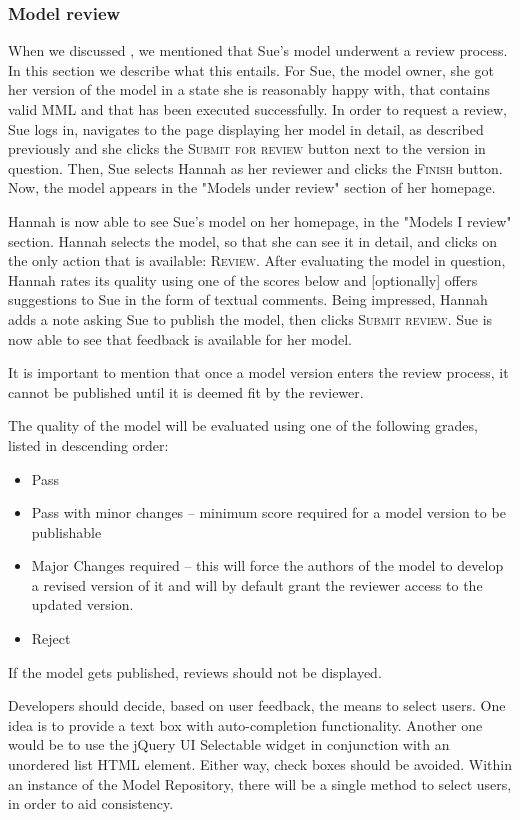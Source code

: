 \subsubsection{Model review}
When we discussed , we mentioned that Sue's model underwent a review process. In this section we describe what this entails.
For Sue, the model owner, she got her version of the model in a state she is reasonably happy with, that contains valid MML and that has been executed successfully. In order to request a review, Sue logs in, navigates to the page displaying her model in detail, as described previously and  she clicks the \textsc{Submit for review} button next to the version in question. Then, Sue selects Hannah as her reviewer and clicks the  \textsc{Finish} button. Now, the model appears in the "Models under review" section of her homepage.

Hannah is now able to see Sue's model on her homepage, in the "Models I review" section. Hannah selects the model, so that she can see it in detail, and clicks on the only action that is available: \textsc{Review}. After evaluating the model in question, Hannah rates its quality using one of the scores below and [optionally] offers suggestions to Sue in the form of textual comments. Being impressed, Hannah adds a note asking Sue to publish the model, then clicks \textsc{Submit review}. Sue is now able to see that feedback is available for her model. 

It is important to mention that once a model version enters the review process, it cannot be published until it is deemed fit by the reviewer.

\begin{techNote}
The quality of the model will be evaluated using one of the following grades, listed in descending order:
\begin{itemize}
\item Pass
\item Pass with minor changes -- minimum score required for a model version to be publishable
\item Major Changes required -- this will force the authors of the model to develop a revised version of it and will by default grant the reviewer access to the updated version. 
\item Reject
\end{itemize}
If the model gets published, reviews should not be displayed. 
\end{techNote}

\begin{techNote}
Developers should decide, based on user feedback, the means to select users. One idea is to provide a text box with auto-completion functionality. Another one would be to use the jQuery UI Selectable widget in conjunction with an unordered list HTML element. Either way, check boxes should be avoided. Within an instance of the Model Repository, there will be a single method to select users, in order to aid consistency.
\end{techNote}

